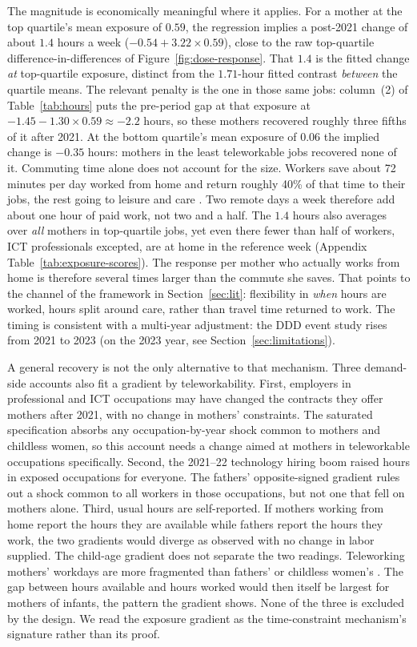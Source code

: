 \documentclass[12pt,a4paper]{article}
\begin{document}
\noindent The magnitude is economically meaningful where it applies. For a mother at the top quartile's
mean exposure of $0.59$, the regression implies a post-2021 change of about $1.4$ hours a week
($-0.54 + 3.22 \times 0.59$), close to the raw top-quartile difference-in-differences of
Figure~\ref{fig:dose-response}. That $1.4$ is the fitted change \emph{at} top-quartile
exposure, distinct from the $1.71$-hour fitted contrast \emph{between} the quartile means. The
relevant penalty is the one in those same jobs: column~(2) of Table~\ref{tab:hours} puts the
pre-period gap at that exposure at $-1.45 - 1.30 \times 0.59 \approx -2.2$ hours, so these
mothers recovered roughly three fifths of it after 2021. At the bottom quartile's mean exposure
of $0.06$ the implied change is $-0.35$ hours: mothers in the least teleworkable jobs recovered
none of it. Commuting time alone does not account for the size. Workers save about 72 minutes
per day worked from home and return roughly 40\% of that time to their jobs, the rest going to
leisure and care \citep{aksoy2023}. Two remote days a week therefore add about one hour of paid
work, not two and a half. The $1.4$ hours also averages over \emph{all} mothers in top-quartile
jobs, yet even there fewer than half of workers, ICT professionals excepted, are at home in the
reference week (Appendix Table~\ref{tab:exposure-scores}). The response per mother who actually works from home is
therefore several times larger than the commute she saves. That points to the channel of the
framework in Section~\ref{sec:lit}: flexibility in \emph{when} hours are worked, hours split
around care, rather than travel time returned to work. The timing is consistent with a
multi-year adjustment: the DDD event study rises from 2021 to 2023 (on the 2023 year, see
Section~\ref{sec:limitations}).

\noindent A general recovery is not the only alternative to that mechanism. Three demand-side accounts
also fit a gradient by teleworkability. First, employers in professional and ICT occupations may
have changed the contracts they offer mothers after 2021, with no change in mothers'
constraints. The saturated specification absorbs any occupation-by-year shock common to mothers
and childless women, so this account needs a change aimed at mothers in teleworkable occupations
specifically. Second, the 2021--22 technology hiring boom raised hours in exposed occupations
for everyone. The fathers' opposite-signed gradient rules out a shock common to all workers in
those occupations, but not one that fell on mothers alone. Third, usual hours are self-reported.
If mothers working from home report the hours they are available while fathers report the hours
they work, the two gradients would diverge as observed with no change in labor supplied. The
child-age gradient does not separate the two readings. Teleworking mothers' workdays are more
fragmented than fathers' or childless women's \citep{pabilonia2022}. The gap between hours available
and hours worked would then itself be largest for mothers of infants, the pattern the gradient
shows. None of the three is excluded by the design. We read the exposure gradient as the
time-constraint mechanism's signature rather than its proof.
\end{document}
